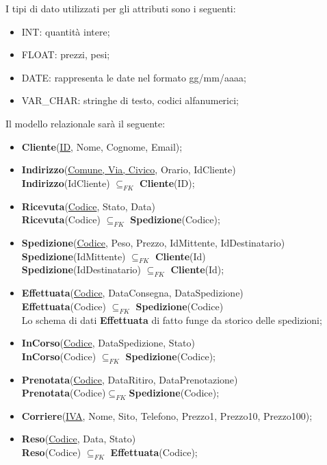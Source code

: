 I tipi di dato utilizzati per gli attributi sono i seguenti:
\begin{itemize}
  \item INT: quantità intere;
  \item FLOAT: prezzi, pesi;
  \item DATE: rappresenta le date nel formato gg/mm/aaaa;
  \item VAR\_CHAR: stringhe di testo, codici alfanumerici;
\end{itemize}

Il modello relazionale sarà il seguente:
\begin{itemize}
  \item \textbf{Cliente}(\underline{ID}, Nome, Cognome, Email);
  \item \textbf{Indirizzo}(\underline{Comune, Via, Civico}, Orario, IdCliente) \\ \textbf{Indirizzo}(IdCliente) $\subseteq _{FK}$ \textbf{Cliente}(ID); 
  \item \textbf{Ricevuta}(\underline{Codice}, Stato, Data)\\ \textbf{Ricevuta}(Codice) $\subseteq _{FK}$ \textbf{Spedizione}(Codice);
  \item \textbf{Spedizione}(\underline{Codice}, Peso, Prezzo, IdMittente, IdDestinatario) \\ \textbf{Spedizione}(IdMittente) $\subseteq _{FK}$ \textbf{Cliente}(Id) \\ \textbf{Spedizione}(IdDestinatario) $\subseteq _{FK}$ \textbf{Cliente}(Id);
  \item \textbf{Effettuata}(\underline{Codice}, DataConsegna, DataSpedizione)\\\textbf{Effettuata}(Codice) $\subseteq _{FK}$ \textbf{Spedizione}(Codice) \\ Lo schema di dati \textbf{Effettuata} di fatto funge da storico delle spedizioni;
  \item \textbf{InCorso}(\underline{Codice}, DataSpedizione, Stato) \\ \textbf{InCorso}(Codice) $\subseteq _{FK}$ \textbf{Spedizione}(Codice);
  \item \textbf{Prenotata}(\underline{Codice}, DataRitiro, DataPrenotazione) \\\textbf{Prenotata}(Codice)$\subseteq _{FK}$\textbf{Spedizione}(Codice);
  \item \textbf{Corriere}(\underline{IVA}, Nome, Sito, Telefono, Prezzo1, Prezzo10, Prezzo100);
  \item \textbf{Reso}(\underline{Codice}, Data, Stato)\\ \textbf{Reso}(Codice) $\subseteq _{FK}$ \textbf{Effettuata}(Codice);
\end{itemize}

